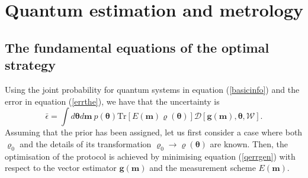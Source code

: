 \section{Quantum estimation and metrology}
\label{sec:qestimation}

\subsection{The fundamental equations of the optimal strategy}
\label{subsec:fundeq}

Using the joint probability for quantum systems in equation (\ref{basicinfo}) and the error in equation (\ref{errthe}), we have that the uncertainty is
\begin{equation}
\bar{\epsilon} = \int d\boldsymbol{\theta} d\boldsymbol{m} ~p(\boldsymbol{\theta})\mathrm{Tr}\left[E(\boldsymbol{m})\varrho(\boldsymbol{\theta})\right]\mathcal{D}[\boldsymbol{g}(\boldsymbol{m}),\boldsymbol{\theta}, \mathcal{W}].
\label{qerrgen}
\end{equation}
Assuming that the prior has been assigned, let us first consider a case where both $\varrho_0$ and the details of its transformation $\varrho_0 \rightarrow \varrho(\boldsymbol{\theta})$ are known. Then, the optimisation of the protocol is achieved by minimising equation (\ref{qerrgen}) with respect to the vector estimator $\boldsymbol{g}(\boldsymbol{m})$ and the measurement scheme $E(\boldsymbol{m})$. 

